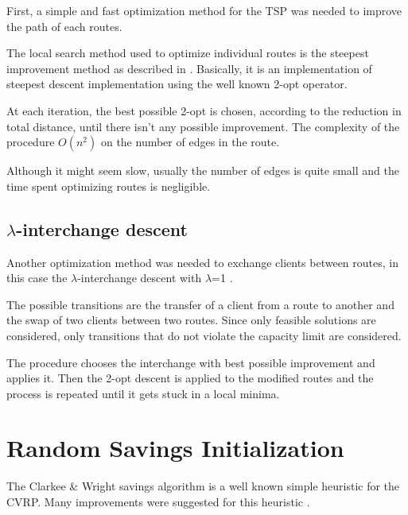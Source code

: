 \documentclass{article} %
\begin{document}
{First, a simple and fast optimization method for the TSP was needed to improve the path of each routes.\newline

The local search method used to optimize individual routes is the steepest improvement method as described in \citep{steepest_improvement}.
Basically, it is an implementation of steepest descent implementation using the well known 2-opt operator.\newline

At each iteration, the best possible 2-opt is chosen, according to the reduction in total distance, until there isn't any possible improvement. The complexity of the procedure $O(n^{2})$ on the number of edges in the route.\newline

Although it might seem slow, usually the number of edges is quite small and the time spent optimizing routes is negligible.\newline



\subsection{$\lambda$-interchange descent}
\label{local_cluster}
Another optimization method was needed to exchange clients between routes, in this case the $\lambda$-interchange descent with $\lambda$=1 \citep{osman1993}.\newline

The possible transitions are the transfer of a client from a route to another and the swap of two clients between two routes. Since only feasible solutions are considered, only transitions that do not violate the capacity limit are considered.\newline

The procedure chooses the interchange with best possible improvement and applies it. Then the 2-opt descent is applied to the modified routes and the process is repeated until it gets stuck in a local minima.


\newpage
\section{Random Savings Initialization}
\label{random_savings}
The Clarkee \& Wright savings algorithm is a well known simple heuristic for the CVRP.
Many improvements were suggested for this heuristic \cite{Clarkee_wright_ds}.\newline

}
\end{document}
